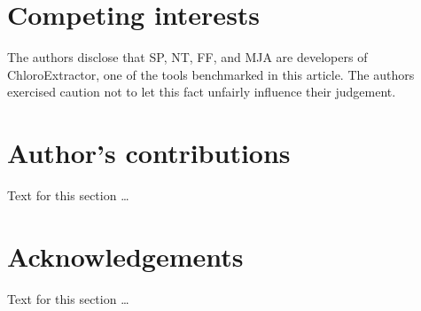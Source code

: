 \documentclass{bmcart}
\begin{document}
\begin{backmatter}

\section*{Competing interests}
  The authors disclose that SP, NT, FF, and MJA are developers of ChloroExtractor, one of the tools benchmarked in this article. The authors exercised caution not to let this fact unfairly influence their judgement.

\section*{Author's contributions}
    Text for this section \ldots

\section*{Acknowledgements}
  Text for this section \ldots




\end{backmatter}
\end{document}
